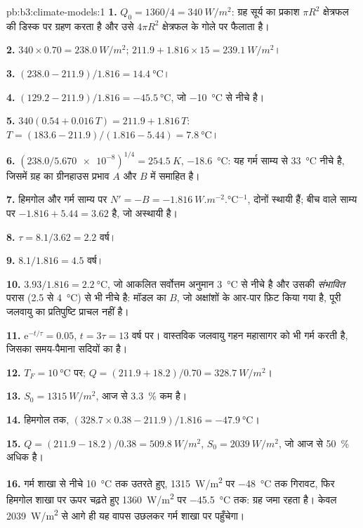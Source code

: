 \begin{solution}{pb:b3:climate-models:1}
\textbf{1.} $Q_0 = 1360/4 = \qty{340}{W/m^2}$: ग्रह सूर्य का प्रकाश
$\pi R^2$ क्षेत्रफल की डिस्क पर ग्रहण करता है और उसे
$4\pi R^2$ क्षेत्रफल के गोले पर फैलाता है।

\textbf{2.} $340\times0.70 = \qty{238.0}{W/m^2}$; $211.9 + 1.816\times15 =
\qty{239.1}{W/m^2}$।

\textbf{3.} $(238.0 - 211.9)/1.816 = \qty{14.4}{\celsius}$।

\textbf{4.} $(129.2 - 211.9)/1.816 = \qty{-45.5}{\celsius}$, जो
\qty{-10}{\celsius} से नीचे है।

\textbf{5.} $340(0.54 + 0.016\,T) = 211.9 + 1.816\,T$: $T =
(183.6 - 211.9)/(1.816 - 5.44) = \qty{7.8}{\celsius}$।

\textbf{6.} $(238.0/\num{5.670e-8})^{1/4} = \qty{254.5}{K}$,
\qty{-18.6}{\celsius}: यह गर्म साम्य से \qty{33}{\celsius} नीचे है, जिसमें ग्रह का ग्रीनहाउस प्रभाव
$A$ और $B$ में समाहित है।

\textbf{7.} हिमगोल और गर्म साम्य पर $N' = -B = \qty{-1.816}{W.m^{-2}.\celsius^{-1}}$, दोनों स्थायी हैं;
बीच वाले साम्य पर $-1.816 + 5.44 =
\num{+3.62}$ है, जो अस्थायी है।

\textbf{8.} $\tau = 8.1/3.62 = \num{2.2}\text{ वर्ष}$।

\textbf{9.} $8.1/1.816 = \num{4.5}\text{ वर्ष}$।

\textbf{10.} $3.93/1.816 = \qty{2.2}{\celsius}$, जो आकलित सर्वोत्तम अनुमान \qty{3}{\celsius} से नीचे है और
उसकी \emph{संभावित} परास (\num{2.5} से \qty{4}{\celsius}) से भी नीचे है:
मॉडल का $B$, जो अक्षांशों के आर-पार फ़िट किया गया है,
पूरी जलवायु का प्रतिपुष्टि प्राचल नहीं है।

\textbf{11.} $\mathrm e^{-t/\tau} = 0.05$, $t = 3\tau =
\num{13}\text{ वर्ष}$ पर। वास्तविक जलवायु गहन महासागर को भी गर्म करती है,
जिसका समय-पैमाना सदियों का है।

\textbf{12.} $T_F = \qty{10}{\celsius}$ पर; $Q = (211.9 + 18.2)/0.70 =
\qty{328.7}{W/m^2}$।

\textbf{13.} $S_0 = \qty{1315}{W/m^2}$, आज से \qty{3.3}{\percent} कम है।

\textbf{14.} हिमगोल तक, $(328.7\times0.38 - 211.9)/1.816 =
\qty{-47.9}{\celsius}$।

\textbf{15.} $Q = (211.9 - 18.2)/0.38 = \qty{509.8}{W/m^2}$, $S_0 =
\qty{2039}{W/m^2}$, जो आज से \qty{50}{\percent} अधिक है।

\textbf{16.} गर्म शाखा से नीचे \qty{10}{\celsius} तक उतरते हुए,
\qty{1315}{W/m^2} पर \qty{-48}{\celsius} तक गिरावट, फिर हिमगोल शाखा पर
ऊपर चढ़ते हुए \qty{1360}{W/m^2} पर \qty{-45.5}{\celsius} तक:
ग्रह जमा रहता है। केवल \qty{2039}{W/m^2} से आगे ही यह
वापस उछलकर गर्म शाखा पर पहुँचेगा।


\end{solution}
